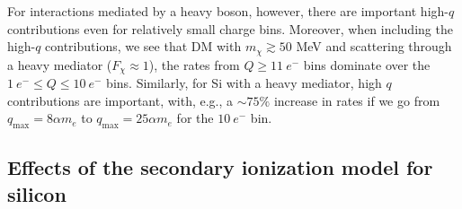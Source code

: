 \documentclass[
    prd, twocolumn, superscriptaddress, nofootinbib, amsmath, amssymb,
    aps, floatfix,preprintnumbers
]{revtex4-2}
\begin{document}
        For interactions mediated by a heavy boson, however, there are important high-$q$ contributions even for relatively small charge bins. Moreover, when including the high-$q$ contributions, we see that DM with $m_\chi \gtrsim 50$ MeV and scattering through a heavy mediator ($F_\chi \approx 1$), the rates from $Q \geq 11\ e^-$ bins dominate over the $1\ e^-\leq Q\leq 10\ e^-$ bins. Similarly, for Si with a heavy mediator, high $q$ contributions are important, with, e.g., a $\sim 75\%$ increase in rates if we go from $q_\mathrm{max} = 8\alpha m_e$ to $q_\mathrm{max} = 25\alpha m_e$ for the $10\ e^-$ bin.
    
    \subsection{Effects of the secondary ionization model for silicon}\label{subsec:second_ionization}
    
\end{document}
